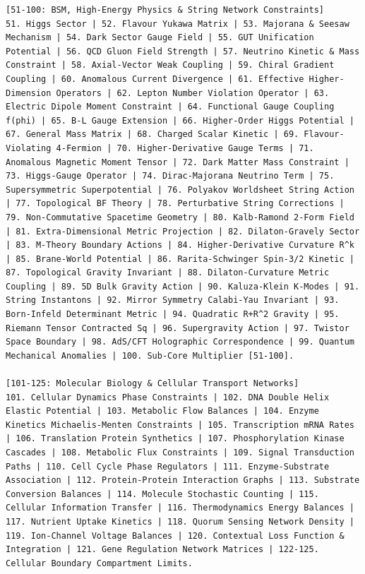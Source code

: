 \documentclass[11pt,a4paper]{article}
\begin{document}
\begin{tcolorbox}
\begin{lstlisting}[basicstyle=\scriptsize\ttfamily, breaklines=true, columns=fullflexible]
[51-100: BSM, High-Energy Physics & String Network Constraints]
51. Higgs Sector | 52. Flavour Yukawa Matrix | 53. Majorana & Seesaw Mechanism | 54. Dark Sector Gauge Field | 55. GUT Unification Potential | 56. QCD Gluon Field Strength | 57. Neutrino Kinetic & Mass Constraint | 58. Axial-Vector Weak Coupling | 59. Chiral Gradient Coupling | 60. Anomalous Current Divergence | 61. Effective Higher-Dimension Operators | 62. Lepton Number Violation Operator | 63. Electric Dipole Moment Constraint | 64. Functional Gauge Coupling f(phi) | 65. B-L Gauge Extension | 66. Higher-Order Higgs Potential | 67. General Mass Matrix | 68. Charged Scalar Kinetic | 69. Flavour-Violating 4-Fermion | 70. Higher-Derivative Gauge Terms | 71. Anomalous Magnetic Moment Tensor | 72. Dark Matter Mass Constraint | 73. Higgs-Gauge Operator | 74. Dirac-Majorana Neutrino Term | 75. Supersymmetric Superpotential | 76. Polyakov Worldsheet String Action | 77. Topological BF Theory | 78. Perturbative String Corrections | 79. Non-Commutative Spacetime Geometry | 80. Kalb-Ramond 2-Form Field | 81. Extra-Dimensional Metric Projection | 82. Dilaton-Gravely Sector | 83. M-Theory Boundary Actions | 84. Higher-Derivative Curvature R^k | 85. Brane-World Potential | 86. Rarita-Schwinger Spin-3/2 Kinetic | 87. Topological Gravity Invariant | 88. Dilaton-Curvature Metric Coupling | 89. 5D Bulk Gravity Action | 90. Kaluza-Klein K-Modes | 91. String Instantons | 92. Mirror Symmetry Calabi-Yau Invariant | 93. Born-Infeld Determinant Metric | 94. Quadratic R+R^2 Gravity | 95. Riemann Tensor Contracted Sq | 96. Supergravity Action | 97. Twistor Space Boundary | 98. AdS/CFT Holographic Correspondence | 99. Quantum Mechanical Anomalies | 100. Sub-Core Multiplier [51-100].

[101-125: Molecular Biology & Cellular Transport Networks]
101. Cellular Dynamics Phase Constraints | 102. DNA Double Helix Elastic Potential | 103. Metabolic Flow Balances | 104. Enzyme Kinetics Michaelis-Menten Constraints | 105. Transcription mRNA Rates | 106. Translation Protein Synthetics | 107. Phosphorylation Kinase Cascades | 108. Metabolic Flux Constraints | 109. Signal Transduction Paths | 110. Cell Cycle Phase Regulators | 111. Enzyme-Substrate Association | 112. Protein-Protein Interaction Graphs | 113. Substrate Conversion Balances | 114. Molecule Stochastic Counting | 115. Cellular Information Transfer | 116. Thermodynamics Energy Balances | 117. Nutrient Uptake Kinetics | 118. Quorum Sensing Network Density | 119. Ion-Channel Voltage Balances | 120. Contextual Loss Function & Integration | 121. Gene Regulation Network Matrices | 122-125. Cellular Boundary Compartment Limits.


\end{lstlisting}
\end{tcolorbox}
\end{document}
